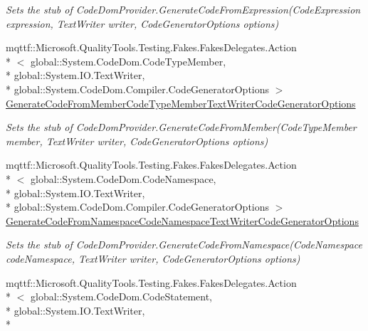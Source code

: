 \begin{DoxyCompactItemize}
\begin{DoxyCompactList}\small\item\em Sets the stub of Code\-Dom\-Provider.\-Generate\-Code\-From\-Expression(\-Code\-Expression expression, Text\-Writer writer, Code\-Generator\-Options options)\end{DoxyCompactList}\item 
mqttf\-::\-Microsoft.\-Quality\-Tools.\-Testing.\-Fakes.\-Fakes\-Delegates.\-Action\\*
$<$ global\-::\-System.\-Code\-Dom.\-Code\-Type\-Member, \\*
global\-::\-System.\-I\-O.\-Text\-Writer, \\*
global\-::\-System.\-Code\-Dom.\-Compiler.\-Code\-Generator\-Options $>$ \hyperlink{class_system_1_1_code_dom_1_1_compiler_1_1_fakes_1_1_stub_code_dom_provider_a6620addb9ca886f27c3db6585269c015}{Generate\-Code\-From\-Member\-Code\-Type\-Member\-Text\-Writer\-Code\-Generator\-Options}
\begin{DoxyCompactList}\small\item\em Sets the stub of Code\-Dom\-Provider.\-Generate\-Code\-From\-Member(\-Code\-Type\-Member member, Text\-Writer writer, Code\-Generator\-Options options)\end{DoxyCompactList}\item 
mqttf\-::\-Microsoft.\-Quality\-Tools.\-Testing.\-Fakes.\-Fakes\-Delegates.\-Action\\*
$<$ global\-::\-System.\-Code\-Dom.\-Code\-Namespace, \\*
global\-::\-System.\-I\-O.\-Text\-Writer, \\*
global\-::\-System.\-Code\-Dom.\-Compiler.\-Code\-Generator\-Options $>$ \hyperlink{class_system_1_1_code_dom_1_1_compiler_1_1_fakes_1_1_stub_code_dom_provider_a280a9bda55999b282e355c78b8b4ebad}{Generate\-Code\-From\-Namespace\-Code\-Namespace\-Text\-Writer\-Code\-Generator\-Options}
\begin{DoxyCompactList}\small\item\em Sets the stub of Code\-Dom\-Provider.\-Generate\-Code\-From\-Namespace(\-Code\-Namespace code\-Namespace, Text\-Writer writer, Code\-Generator\-Options options)\end{DoxyCompactList}\item 
mqttf\-::\-Microsoft.\-Quality\-Tools.\-Testing.\-Fakes.\-Fakes\-Delegates.\-Action\\*
$<$ global\-::\-System.\-Code\-Dom.\-Code\-Statement, \\*
global\-::\-System.\-I\-O.\-Text\-Writer, \\*

\end{DoxyCompactItemize}
